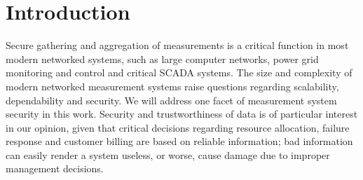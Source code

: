 
\chapter{Introduction}
\label{sec:intro}


Secure gathering and aggregation of measurements is a critical function in most modern networked systems, such as large computer networks, power grid monitoring and control and critical SCADA systems. The size and complexity of modern networked measurement systems raise questions regarding scalability, dependability and security. We will address one facet of measurement system security in this work. Security and trustworthiness of data is of particular interest in our opinion, given that critical decisions regarding resource allocation, failure response and customer billing are based on reliable information; bad information can easily render a system useless, or worse, cause damage due to improper management decisions.



